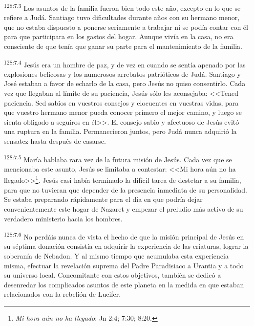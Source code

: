 \par 
\textsuperscript{128:7.3} Los asuntos de la familia fueron bien todo este año, excepto en lo que se refiere a Judá. Santiago tuvo dificultades durante años con su hermano menor, que no estaba dispuesto a ponerse seriamente a trabajar ni se podía contar con él para que participara en los gastos del hogar. Aunque vivía en la casa, no era consciente de que tenía que ganar su parte para el mantenimiento de la familia.

\par 
\textsuperscript{128:7.4} Jesús era un hombre de paz, y de vez en cuando se sentía apenado por las explosiones belicosas y los numerosos arrebatos patrióticos de Judá. Santiago y José estaban a favor de echarlo de la casa, pero Jesús no quiso consentirlo. Cada vez que llegaban al límite de su paciencia, Jesús sólo les aconsejaba: <<Tened paciencia. Sed sabios en vuestros consejos y elocuentes en vuestras vidas, para que vuestro hermano menor pueda conocer primero el mejor camino, y luego se sienta obligado a seguiros en él>>. El consejo sabio y afectuoso de Jesús evitó una ruptura en la familia. Permanecieron juntos, pero Judá nunca adquirió la sensatez hasta después de casarse.

\par 
\textsuperscript{128:7.5} María hablaba rara vez de la futura misión de Jesús. Cada vez que se mencionaba este asunto, Jesús se limitaba a contestar: <<Mi hora aún no ha llegado>>\footnote{\textit{Mi hora aún no ha llegado}: Jn 2:4; 7:30; 8:20.}. Jesús casi había terminado la difícil tarea de destetar a su familia, para que no tuvieran que depender de la presencia inmediata de su personalidad. Se estaba preparando rápidamente para el día en que podría dejar convenientemente este hogar de Nazaret y empezar el preludio más activo de su verdadero ministerio hacia los hombres.

\par 
\textsuperscript{128:7.6} No perdáis nunca de vista el hecho de que la misión principal de Jesús en su séptima donación consistía en adquirir la experiencia de las criaturas, lograr la soberanía de Nebadon. Y al mismo tiempo que acumulaba esta experiencia misma, efectuar la revelación suprema del Padre Paradisiaco a Urantia y a todo su universo local. Concomitante con estos objetivos, también se dedicó a desenredar los complicados asuntos de este planeta en la medida en que estaban relacionados con la rebelión de Lucifer.

